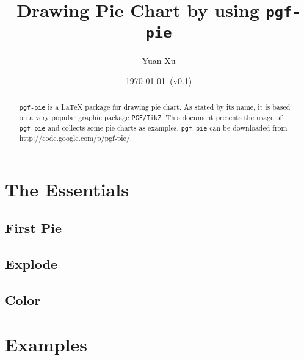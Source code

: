 \documentclass{article}
\newcommand{\demo}[2][1]{
\begin{minipage}{.49\linewidth}
\centering
\resizebox{#1\linewidth}{!}{

}
\end{minipage}
\hspace{0.01\linewidth}
\begin{minipage}{.5\linewidth}

\end{minipage}
}
\begin{document}
\title{Drawing Pie Chart by using \texttt{pgf-pie}}
\author{\href{mailto:xuyuan.cn@gmail.com}{Yuan Xu}}
\date{\today{}~(v0.1)}
\maketitle

\begin{abstract}
  \texttt{pgf-pie} is a LaTeX package for drawing pie chart. As stated
  by its name, it is based on a very popular graphic package
  \texttt{PGF/TikZ}. This document presents the usage of
  \texttt{pgf-pie} and collects some pie charts as examples.
  \texttt{pgf-pie} can be downloaded from
  \href{http://code.google.com/p/pgf-pie/}{http://code.google.com/p/pgf-pie/}.
\end{abstract}

\tableofcontents

\section{The Essentials}

\subsection{First Pie}
\demo[0.6]{first-pie}

\subsection{Explode}
\demo[0.6]{explode}

\subsection{Color}
\demo[0.6]{color}

\section{Examples}








\end{document}
